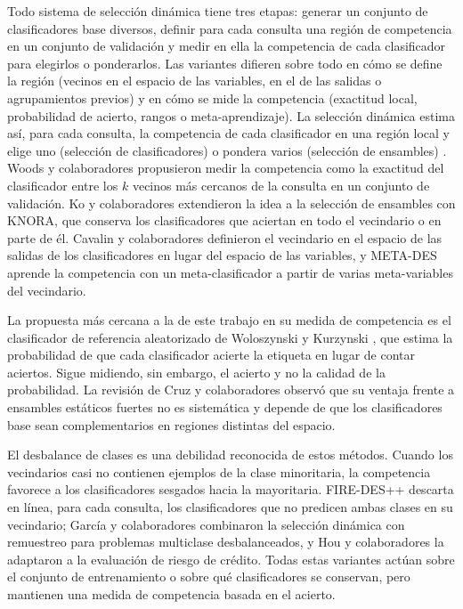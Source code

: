 \documentclass[pdflatex,sn-mathphys-num]{sn-jnl}
\theoremstyle{plain}
\begin{document}
Todo sistema de selección dinámica tiene tres etapas: generar un conjunto de clasificadores base diversos, definir para cada consulta una región de competencia en un conjunto de validación y medir en ella la competencia de cada clasificador para elegirlos o ponderarlos. Las variantes difieren sobre todo en cómo se define la región (vecinos en el espacio de las variables, en el de las salidas o agrupamientos previos) y en cómo se mide la competencia (exactitud local, probabilidad de acierto, rangos o meta-aprendizaje). La selección dinámica estima así, para cada consulta, la competencia de cada clasificador en una región local y elige uno (selección de clasificadores) o pondera varios (selección de ensambles) \cite{bib_cruz_2018}. Woods y colaboradores \cite{bib_woods_1997} propusieron medir la competencia como la exactitud del clasificador entre los $k$ vecinos más cercanos de la consulta en un conjunto de validación. Ko y colaboradores \cite{bib_ko_2008} extendieron la idea a la selección de ensambles con KNORA, que conserva los clasificadores que aciertan en todo el vecindario o en parte de él. Cavalin y colaboradores \cite{bib_cavalin_2013} definieron el vecindario en el espacio de las salidas de los clasificadores en lugar del espacio de las variables, y META-DES \cite{bib_cruz_2015} aprende la competencia con un meta-clasificador a partir de varias meta-variables del vecindario.

La propuesta más cercana a la de este trabajo en su medida de competencia es el clasificador de referencia aleatorizado de Woloszynski y Kurzynski \cite{bib_woloszynski_2011}, que estima la probabilidad de que cada clasificador acierte la etiqueta en lugar de contar aciertos. Sigue midiendo, sin embargo, el acierto y no la calidad de la probabilidad. La revisión de Cruz y colaboradores \cite{bib_cruz_2018} observó que su ventaja frente a ensambles estáticos fuertes no es sistemática y depende de que los clasificadores base sean complementarios en regiones distintas del espacio.

El desbalance de clases es una debilidad reconocida de estos métodos. Cuando los vecindarios casi no contienen ejemplos de la clase minoritaria, la competencia favorece a los clasificadores sesgados hacia la mayoritaria. FIRE-DES++ \cite{bib_cruz_2019} descarta en línea, para cada consulta, los clasificadores que no predicen ambas clases en su vecindario; García y colaboradores \cite{bib_garcia_2018} combinaron la selección dinámica con remuestreo para problemas multiclase desbalanceados, y Hou y colaboradores \cite{bib_hou_2020} la adaptaron a la evaluación de riesgo de crédito. Todas estas variantes actúan sobre el conjunto de entrenamiento o sobre qué clasificadores se conservan, pero mantienen una medida de competencia basada en el acierto.
\end{document}
